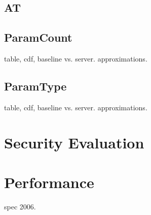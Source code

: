 \subsection{AT}
\subsection{ParamCount}
table, cdf, baseline vs. server. approximations.

\subsection{ParamType}
table, cdf, baseline vs. server. approximations.

\section{Security Evaluation}

\section{Performance}
spec 2006.
